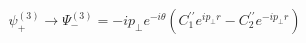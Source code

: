 \begin{equation}
\label{22}\psi _{+}^{(3)}\rightarrow \Psi _{-}^{(3)}=-ip_{\bot }e^{-i\theta
}\left( C_1^{\prime \prime }e^{ip_{\bot }r}-C_2^{\prime \prime }e^{-ip_{\bot
}r}\right) 
\end{equation}

